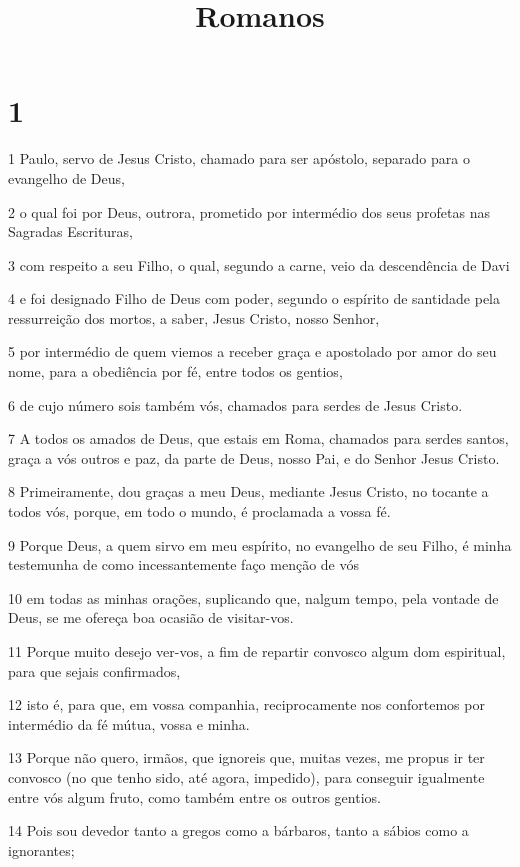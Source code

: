 

\title{Romanos}


\chapter{1}

\par 1 Paulo, servo de Jesus Cristo, chamado para ser apóstolo, separado para o evangelho de Deus,
\par 2 o qual foi por Deus, outrora, prometido por intermédio dos seus profetas nas Sagradas Escrituras,
\par 3 com respeito a seu Filho, o qual, segundo a carne, veio da descendência de Davi
\par 4 e foi designado Filho de Deus com poder, segundo o espírito de santidade pela ressurreição dos mortos, a saber, Jesus Cristo, nosso Senhor,
\par 5 por intermédio de quem viemos a receber graça e apostolado por amor do seu nome, para a obediência por fé, entre todos os gentios,
\par 6 de cujo número sois também vós, chamados para serdes de Jesus Cristo.
\par 7 A todos os amados de Deus, que estais em Roma, chamados para serdes santos, graça a vós outros e paz, da parte de Deus, nosso Pai, e do Senhor Jesus Cristo.
\par 8 Primeiramente, dou graças a meu Deus, mediante Jesus Cristo, no tocante a todos vós, porque, em todo o mundo, é proclamada a vossa fé.
\par 9 Porque Deus, a quem sirvo em meu espírito, no evangelho de seu Filho, é minha testemunha de como incessantemente faço menção de vós
\par 10 em todas as minhas orações, suplicando que, nalgum tempo, pela vontade de Deus, se me ofereça boa ocasião de visitar-vos.
\par 11 Porque muito desejo ver-vos, a fim de repartir convosco algum dom espiritual, para que sejais confirmados,
\par 12 isto é, para que, em vossa companhia, reciprocamente nos confortemos por intermédio da fé mútua, vossa e minha.
\par 13 Porque não quero, irmãos, que ignoreis que, muitas vezes, me propus ir ter convosco (no que tenho sido, até agora, impedido), para conseguir igualmente entre vós algum fruto, como também entre os outros gentios.
\par 14 Pois sou devedor tanto a gregos como a bárbaros, tanto a sábios como a ignorantes;
